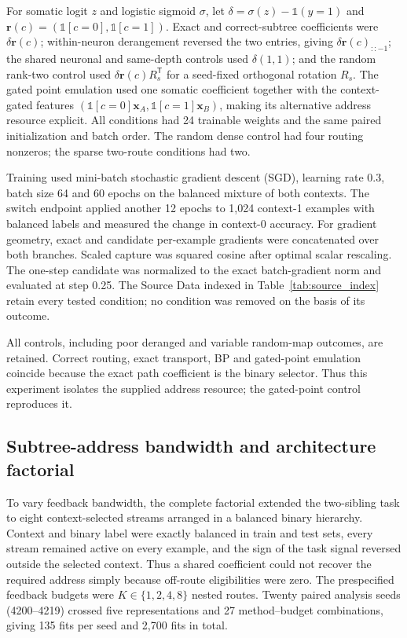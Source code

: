 For somatic logit $z$ and logistic sigmoid $\sigma$, let
$\delta=\sigma(z)-\mathbb 1(y=1)$ and
$\bm r(c)=(\mathbb 1[c=0],\mathbb 1[c=1])$. Exact and correct-subtree
coefficients were $\delta\bm r(c)$; within-neuron derangement reversed the
two entries, giving $\delta\bm r(c)_{::-1}$; the shared neuronal and same-depth controls used
$\delta(1,1)$; and the random rank-two control used
$\delta\bm r(c)R_s^{\mathsf T}$ for a seed-fixed orthogonal rotation $R_s$.
The gated point emulation used one somatic coefficient together with the
context-gated features $(\mathbb 1[c=0]\bm x_A,
\mathbb 1[c=1]\bm x_B)$, making its alternative address resource explicit.
All conditions had 24 trainable weights and the same paired initialization and
batch order. The random dense control had four routing nonzeros; the sparse
two-route conditions had two.

Training used mini-batch stochastic gradient descent (SGD), learning rate 0.3,
batch size 64 and 60 epochs on the balanced mixture of both contexts.
The switch endpoint applied another 12 epochs to 1,024 context-1 examples with
balanced labels and measured the change in context-0 accuracy. For gradient
geometry, exact and candidate per-example gradients were concatenated over
both branches. Scaled capture was squared cosine after optimal scalar
rescaling. The one-step candidate was normalized to the exact batch-gradient
norm and evaluated at step 0.25. The Source Data indexed in Table~\ref{tab:source_index} retain every
tested condition; no condition was removed on the basis of its outcome.

All controls, including poor deranged and variable random-map outcomes, are retained. Correct routing, exact transport, BP and gated-point emulation coincide because the exact path coefficient is the binary selector. Thus this experiment isolates the supplied address resource; the gated-point control reproduces it.

\subsection{Subtree-address bandwidth and architecture factorial}

To vary feedback bandwidth, the complete factorial extended the two-sibling
task to eight context-selected streams arranged in a balanced binary hierarchy. Context and binary
label were exactly balanced in train and test sets, every stream remained
active on every example, and the sign of the task signal reversed outside the
selected context. Thus a shared coefficient could not recover the required address simply
because off-route eligibilities were zero. The prespecified feedback budgets
were $K\in\{1,2,4,8\}$ nested routes. Twenty paired analysis seeds
(4200--4219) crossed five representations and 27 method--budget combinations,
giving 135 fits per seed and 2,700 fits in total.

